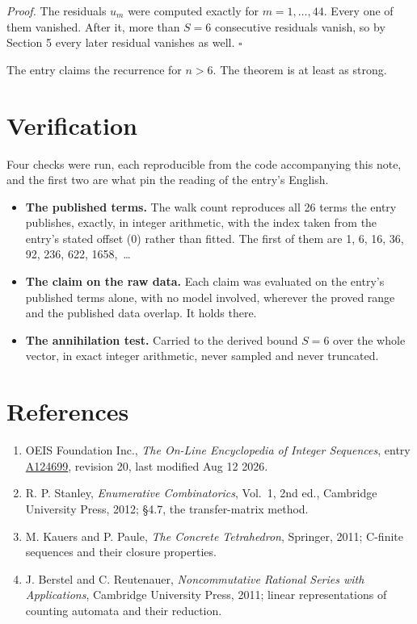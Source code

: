 \documentclass[11pt]{article}
\theoremstyle{definition}
\begin{document}
{\itshape Proof.} The residuals $u_m$ were computed exactly for $m = 1,\dots,44$. Every one of them vanished. After it, more than $S = 6$ consecutive residuals vanish, so by Section 5 every later residual vanishes as well. $\square$

The entry claims the recurrence for $n > 6$. The theorem is at least as strong.

\section{Verification}

Four checks were run, each reproducible from the code accompanying this note, and the first two are what pin the reading of the entry's English.

\begin{itemize}

\item {\bfseries The published terms.} The walk count reproduces all 26 terms the entry publishes, exactly, in integer arithmetic, with the index taken from the entry's stated offset (0) rather than fitted. The first of them are 1, 6, 16, 36, 92, 236, 622, 1658,~\dots

\item {\bfseries The claim on the raw data.} Each claim was evaluated on the entry's published terms alone, with no model involved, wherever the proved range and the published data overlap. It holds there.

\item {\bfseries The annihilation test.} Carried to the derived bound $S = 6$ over the whole vector, in exact integer arithmetic, never sampled and never truncated.

\end{itemize}

\section{References}

\begin{enumerate}

\item OEIS Foundation Inc., \emph{The On-Line Encyclopedia of Integer Sequences}, entry \href{https://oeis.org/A124699}{A124699}, revision 20, last modified Aug 12 2026.

\item R. P. Stanley, \emph{Enumerative Combinatorics}, Vol.~1, 2nd ed., Cambridge University Press, 2012; \S4.7, the transfer-matrix method.

\item M. Kauers and P. Paule, \emph{The Concrete Tetrahedron}, Springer, 2011; C-finite sequences and their closure properties.

\item J. Berstel and C. Reutenauer, \emph{Noncommutative Rational Series with Applications}, Cambridge University Press, 2011; linear representations of counting automata and their reduction.

\end{enumerate}
\end{document}
